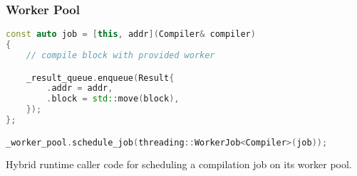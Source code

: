\subsubsection{Worker Pool}



\begin{lstfloat}[H]
    \begin{lstlisting}[language=c++]
const auto job = [this, addr](Compiler& compiler)
{
    // compile block with provided worker

    _result_queue.enqueue(Result{
        .addr = addr,
        .block = std::move(block),
    });
};

_worker_pool.schedule_job(threading::WorkerJob<Compiler>(job));
    \end{lstlisting}
    \caption{Hybrid runtime caller code for scheduling a compilation job on its worker pool.}
    \label{code:schedule-job-worker}
\end{lstfloat}